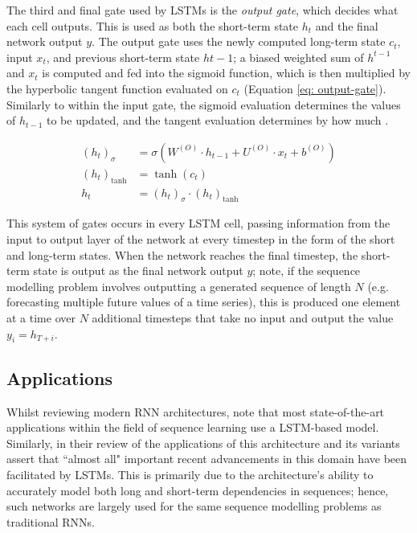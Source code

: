 \documentclass[a4paper, 11pt]{report}
\begin{document}
    The third and final gate used by LSTMs is the \emph{output gate}, which decides what each cell outputs. This is used as both the short-term state $h_t$ and the final network output $y$. The output gate uses the newly computed long-term state $c_t$, input $x_t$, and previous short-term state $h{t-1}$; a biased weighted sum of $h^{t-1}$ and $x_t$ is computed and fed into the sigmoid function, which is then multiplied by the hyperbolic tangent function evaluated on $c_t$ (Equation \ref{eq: output-gate}). Similarly to within the input gate, the sigmoid evaluation determines the values of $h_{t-1}$ to be updated, and the tangent evaluation determines by how much \citep{zhang-2021}.

    \begin{align}
        \label{eq: output-gate}
        (h_t)_{\sigma} &= \sigma( W^{(O)} \cdot h_{t-1} + U^{(O)} \cdot x_t + b^{(O)} ) \\
        (h_t)_{\tanh} &= \tanh{( c_t )} \\
        h_t &= (h_t)_{\sigma} \cdot (h_t)_{\tanh}
    \end{align}

    This system of gates occurs in every LSTM cell, passing information from the input to output layer of the network at every timestep in the form of the short and long-term states. When the network reaches the final timestep, the short-term state is output as the final network output $y$; note, if the sequence modelling problem involves outputting a generated sequence of length $N$ (e.g. forecasting multiple future values of a time series), this is produced one element at a time over $N$ additional timesteps that take no input and output the value $y_i = h_{T+i}$.


    \subsection{Applications}

    Whilst reviewing modern RNN architectures, \citet{lipton-2015} note that most state-of-the-art applications within the field of sequence learning use a LSTM-based model. Similarly,  in their review of the applications of this architecture and its variants \citet{yu-2019} assert that ``almost all" important recent advancements in this domain have been facilitated by LSTMs. This is primarily due to the architecture's ability to accurately model both long and short-term dependencies in sequences; hence, such networks are largely used for the same sequence modelling problems as traditional RNNs. 
\end{document}
